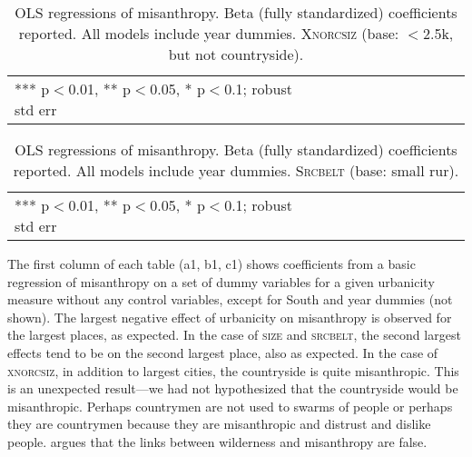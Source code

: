 \documentclass[11pt, letterpaper]{article}
\begin{document}
\begin{spacing}{1.4}
\begin{table}[h!]\centering
\caption{OLS regressions  of misanthropy. Beta (fully standardized) coefficients
  reported. All models include year dummies.  \textsc{Xnorcsiz} (base: $<$2.5k, but not countryside).} \label{regB}
\begin{scriptsize} \begin{tabular}{p{1.8in}p{.45in}p{.45in}p{.45in}p{.45in}p{.45in}p{.45in}p{.45in}p{.45in}p{.45in}p{.45 in}}\hline

\hline  *** p$<$0.01, ** p$<$0.05, * p$<$0.1; robust std err
\end{tabular}\end{scriptsize}\end{table}

\begin{table}[h!]\centering
\caption{OLS regressions  of misanthropy. Beta (fully standardized) coefficients
  reported. All models include year dummies. \textsc{Srcbelt} (base: small rur).} \label{regC}
\begin{scriptsize} \begin{tabular}{p{1.8in}p{.45in}p{.45in}p{.45in}p{.45in}p{.45in}p{.45in}p{.45in}p{.45in}p{.45in}p{.45 in}}\hline

\hline  *** p$<$0.01, ** p$<$0.05, * p$<$0.1; robust std err
\end{tabular}\end{scriptsize}\end{table}

The first column of each table (a1, b1, c1) shows coefficients from a basic
regression of misanthropy on a set of dummy variables for a given urbanicity
measure without any control variables, except for South and year dummies (not shown). 
The largest negative effect of urbanicity on misanthropy is observed for the largest
places, as expected. In the case of \textsc{size} and \textsc{srcbelt}, the second largest effects tend to be on the second largest place, also as expected.  In
the case of \textsc{xnorcsiz}, in addition to largest cities,  the countryside is quite
misanthropic. This is an unexpected result---we had not hypothesized that the countryside would be misanthropic. Perhaps countrymen are not used to swarms of people or
perhaps they are countrymen because they are misanthropic and distrust and
dislike people. \citet{keeling13} argues that the links between wilderness and misanthropy are false. 


\end{spacing}
\end{document}
